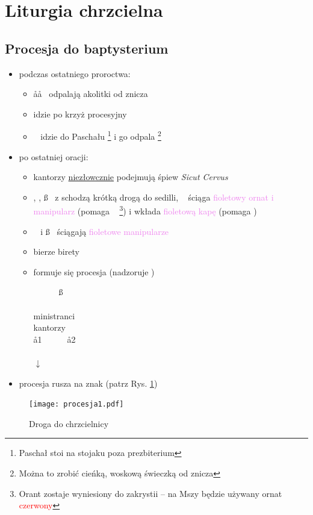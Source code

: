\section{Liturgia chrzcielna}

\subsection{Procesja do baptysterium}

\begin{itemize}
	\item podczas ostatniego proroctwa:
	      \begin{itemize}
		      \item \aa\aa~ odpalają akolitki od znicza
		      \item {} idzie po krzyż procesyjny
		      \item \paschal~ idzie do Paschału \footnote{Paschał stoi na
			            stojaku poza prezbiterium} i go odpala \footnote{Można
			            to zrobić cieńką, woskową świeczką od znicza}
	      \end{itemize}
	\item po ostatniej oracji:
	      \begin{itemize}
		      \item kantorzy \underline{niezłowcznie}
		            podejmują śpiew \textit{Sicut Cervus}
		      \item \ii, \dd, \ss~ z  schodzą krótką drogą do sedilli,
		            \ii~ ściąga \textcolor{violet}{fioletowy ornat i manipularz}
		            (pomaga \zz~ \footnote{Orant zostaje wyniesiony do zakrystii
			            -- na Mszy będzie używany ornat \textcolor{red}{czerwony}})
		            i wkłada \textcolor{violet}{fioletową kapę} (pomaga )
		      \item \dd~ i \ss~ ściągają \textcolor{violet}{fioletowe manipularze}
		      \item {} bierze birety
		      \item formuje się procesja (nadzoruje )
		            \begin{center}
			            \dd~~~\ii~~~\ss \smallskip\\
			            ~~~ \\
			            ministranci \smallskip\\
			            kantorzy \smallskip\\
			            \aa1~~~~~~\aa2 \smallskip\\
			            ~~\paschal~~~~~~~ \smallskip\\
			            $\downarrow$
		            \end{center}
	      \end{itemize}
	\item procesja rusza na znak  (patrz Rys. \ref{fig:procesja1})
\end{itemize}
%
\begin{figure}[h]
	\centering
	\texttt{[image: procesja1.pdf]}
	\caption{Droga do chrzcielnicy}
	\label{fig:procesja1}
\end{figure}
%

